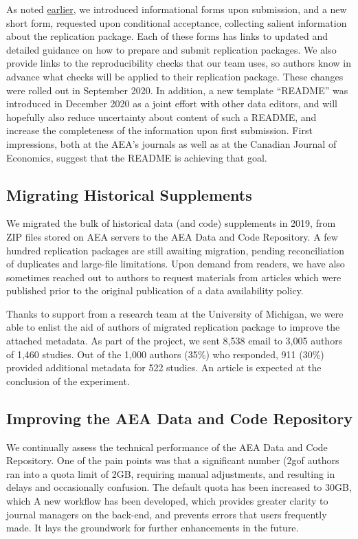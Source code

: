 \documentclass[PP]{AEA}
\newcommand{\aeadcr}{AEA Data and Code Repository}
\begin{document}
As noted  \hyperref[sec:dcap]{earlier}, we introduced informational forms upon submission, and a new short form, requested upon conditional acceptance, collecting salient information about the replication package. Each of these forms has   links to updated and detailed guidance on how to prepare and submit replication packages. We also provide links to the reproducibility checks that our team uses, so authors know in advance what checks will be applied to their replication package. These changes were rolled out in September 2020. In addition, a new template ``README'' \citep{READMEv1.0.0} was introduced in December 2020 as a joint effort with other data editors, and will hopefully also reduce uncertainty about content of such a README, and increase the completeness of the information upon first submission. First impressions, both at the AEA's journals as well as at the Canadian Journal of Economics, suggest that the README is achieving that goal.


\subsection{Migrating Historical Supplements}
\label{sec:migration}

We  migrated the bulk of historical data (and code) supplements in 2019, from ZIP files stored on AEA servers to the \aeadcr{}. A few hundred replication packages are still awaiting migration, pending reconciliation of duplicates and large-file limitations. Upon demand from readers, we have also sometimes reached out to authors to request materials from articles which were published prior to the original publication of a data availability policy. 


Thanks to support from a research team at the University of Michigan, we were able to enlist the aid of authors of migrated replication package to improve the attached metadata.  As part of the project, we sent 8,538 email to 3,005 authors of 1,460 studies. Out of the 1,000 authors (35\%) who responded, 911 (30\%) provided additional metadata for 522 studies. An article is expected at the conclusion of the experiment. 

\subsection{Improving the \aeadcr{}}
\label{sec:improvingaeadcr}

We continually assess the technical performance of the \aeadcr{}. One of the pain points was that a significant number (\pkgsize2gof authors ran into a quota limit of 2GB, requiring manual adjustments, and resulting in delays and occasionally confusion. The default quota has been increased to 30GB, which  A new workflow has been developed, which provides greater clarity to journal managers on the back-end, and prevents errors that users frequently made. It lays the groundwork for further enhancements in the future. 
\end{document}
